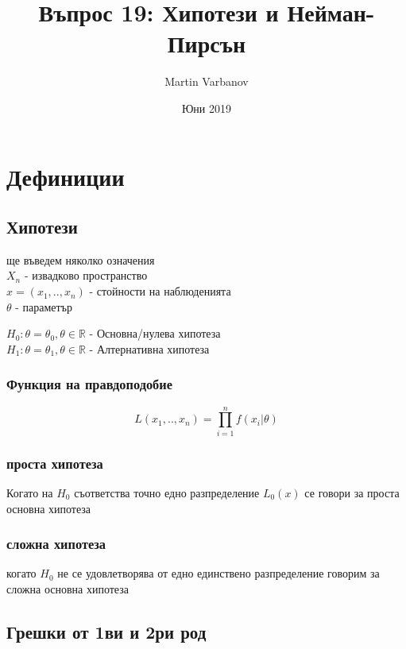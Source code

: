 \documentclass{article}
\begin{document}
\title{Въпрос 19: Хипотези и Нейман-Пирсън}
\author{Martin Varbanov}
\date{Юни 2019}
\maketitle

\section{Дефиниции}

\subsection{Хипотези}

ще въведем няколко означения \\

$X_n$ - извадково пространство \\

$x=(x_1,..,x_n)$ - стойности на наблюденията \\

$\theta$ - параметър

$H_0 : \theta = \theta_0, \theta \in \mathbb{R}$ - Основна/нулева хипотеза \\

$H_1 : \theta = \theta_1, \theta \in \mathbb{R}$ - Алтернативна хипотеза \\



\subsubsection{Функция на правдоподобие}
$$L(x_1,..,x_n) = \prod_{i=1}^n f(x_i | \theta)$$


\subsubsection{проста хипотеза}
Когато на $H_0$ съответства точно едно разпределение $L_0(x)$ се говори за проста основна хипотеза

\subsubsection{сложна хипотеза}
когато $H_0$ не се удовлетворява от едно единствено разпределение говорим за сложна основна хипотеза




\subsection{Грешки от 1ви и 2ри род}
\end{document}
